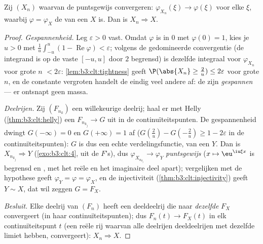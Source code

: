 \begin{theorem}
\label{thm:b3:clt:levy}
Zij $(X_n)$  waarvan de  puntsgewijs convergeren: $\varphi_{X_n}(\xi) \to
\varphi(\xi)$ voor elke $\xi$, waarbij $\varphi = \varphi_X$ de
 van een  $X$ is. Dan
is $X_n \Rightarrow X$.
\end{theorem}

\begin{proof}
\emph{Gespannenheid.} Leg $\varepsilon > 0$ vast. Omdat $\varphi$
 is in $0$ met $\varphi(0) = 1$, kies je $u > 0$ met
$\frac1u\int_{-u}^u(1 - \operatorname{Re}\varphi) < \varepsilon$;
volgens de gedomineerde convergentie (de integrand is op de vaste
$[-u,u]$ door $2$ begrensd) is dezelfde integraal voor
$\varphi_{X_n}$ voor grote $n$ $< 2\varepsilon$:
\cref{lem:b3:clt:tightness} geeft $\P(\abs{X_n} \geq \frac2u)
\leq 2\varepsilon$ voor grote $n$, en de constante vergroten
handelt de eindig veel andere af: de  zijn
\emph{gespannen} --- er ontsnapt geen massa.

\emph{Deelrijen.} Zij $(F_{n_k})$ een willekeurige deelrij; haal
er met Helly (\cref{thm:b3:clt:helly}) een $F_{n_{k_j}} \to G$
uit in de continuïteitspunten. De gespannenheid dwingt
$G(-\infty) = 0$ en $G(+\infty) = 1$ af ($G(\frac2u) -
G(-\frac2u) \geq 1 - 2\varepsilon$ in de continuïteitspunten):
$G$ is dus een echte verdelingsfunctie, van een
 $Y$. Dan is $X_{n_{k_j}} \Rightarrow Y$
(\cref{exo:b3:clt:4},  uit de $F$'s),
dus $\varphi_{X_{n_{k_j}}} \to \varphi_Y$ \emph{puntsgewijs} ($x
\mapsto \eu^{\iu\xi x}$ is begrensd en , met het reële en
het imaginaire deel apart); vergelijken met de hypothese geeft
$\varphi_Y = \varphi = \varphi_X$, en de injectiviteit
(\cref{thm:b3:clt:injectivity}) geeft $Y \sim X$, dat wil zeggen
$G = F_X$.

\emph{Besluit.} Elke deelrij van $(F_n)$ heeft een deeldeelrij
die naar \emph{dezelfde} $F_X$ convergeert (in haar
continuïteitspunten); dus $F_n(t) \to F_X(t)$ in elk
continuïteitspunt $t$ (een reële rij waarvan alle deelrijen
deeldeelrijen met dezelfde limiet hebben, convergeert): $X_n
\Rightarrow X$.
\end{proof}

